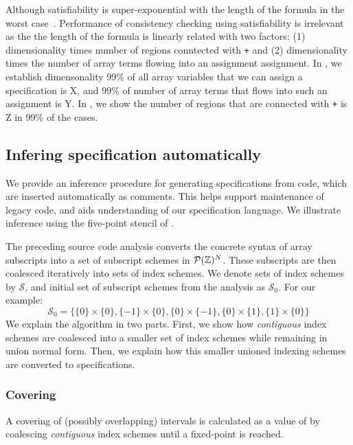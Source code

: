 Although satisfiability is super-exponential with the length of the formula in
the worst case~\cite{fischer1974super}. Performance of consistency checking
using satisfiability is irrelevant as the the length of the formula is linearly
related with two factors: (1) dimensionality times number of regions conntected
with \texttt{+} and (2) dimensionality times the number of array terms flowing
into an assignment assignment. In , we establish dimensonality
99\% of all array variables that we can assign a specification is X, and 99\% of
number of array terms that flows into such an assignment is Y. In
, we show the number of regions that are connected with
\texttt{+} is Z in 99\% of the cases.


\subsection{Infering specification automatically}
\label{subsec:inference}
%
\noindent
We provide an inference procedure for generating specifications from
code, which are inserted automatically as comments. This helps support
maintenance of legacy code, and aids understanding of our
specification language. We illustrate inference using the
five-point stencil of .

The preceding source code analysis converts the concrete syntax of
array subscripts into a set of subscript schemes in
$\mathcal{P}(\textnormal{$\mathbb{Z}$})^N$. These subscripts are then coalesced iteratively
into sets of index schemes. We denote sets of index schemes by
$\mathcal{S}$, and initial set of subscript schemes from the analysis
as $\mathcal{S}_0$. For our example:
%
\begin{equation*}
\mathcal{S}_0 = \{\{0\} \times \{0\}, \{-1\} \times \{0\},
\{0\} \times \{-1\}, \{0\} \times \{1\}, \{1\} \times \{0\}\}
\end{equation*}
%
%
We explain the algorithm in two parts. First, we show how
\emph{contiguous} index schemes are coalesced into a smaller set of
index schemes while remaining in union normal form. Then, we explain
how this smaller unioned indexing schemes are converted to
specifications.

\subsubsection{Covering}
A covering of (possibly overlapping) intervals is calculated as a
value of  by coalescing \emph{contiguous} index schemes
until a fixed-point is reached.

